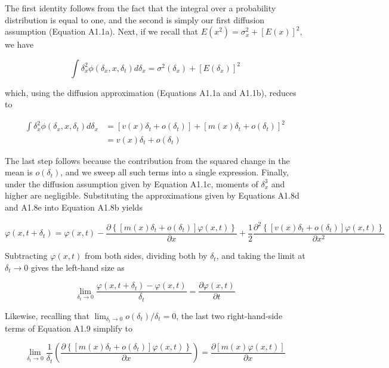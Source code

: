 \documentclass{article}
\begin{document}
The first identity follows from the fact that the integral over a probability distribution is equal to one, and the second is simply our first diffusion assumption (Equation A1.1a). Next, if we recall that  $ E(x^2) = \sigma_x^2 + [E(x)]^2 $, we have

\begin{equation}
\int\delta_{x}^{2}\phi(\delta_{x},x,\delta_{t})d\delta_{x}=\sigma^{2}(\delta_{x})+[E(\delta_{x})]^{2}
\end{equation}

which, using the diffusion approximation (Equations A1.1a and A1.1b), reduces to

\begin{equation}
\begin{align*}\int\delta_{x}^{2}\phi(\delta_{x},x,\delta_{t})d\delta_{x}&=[v(x)\delta_{t}+o(\delta_{t})]+[m(x)\delta_{t}+o(\delta_{t})]^{2}\\&=v(x)\delta_{t}+o(\delta_{t})\end{align*}
\end{equation}

The last step follows because the contribution from the squared change in the mean is  $ o(\delta_t) $, and we sweep all such terms into a single expression. Finally, under the diffusion assumption given by Equation A1.1c, moments of  $ \delta_x^3 $ and higher are negligible. Substituting the approximations given by Equations A1.8d and A1.8e into Equation A1.8b yields

\begin{equation}
\varphi(x,t+\delta_{t})=\varphi(x,t)-\frac{\partial\left\{\left[m(x)\delta_{t}+o(\delta_{t})\right]\varphi(x,t)\right\}}{\partial x}+\frac{1}{2}\frac{\partial^{2}\left\{\left[v(x)\delta_{t}+o(\delta_{t})\right]\varphi(x,t)\right\}}{\partial x^{2}}
\end{equation}

Subtracting  $ \varphi(x,t) $ from both sides, dividing both by  $ \delta_{t} $, and taking the limit at  $ \delta_{t}\to0 $ gives the left-hand size as

\begin{equation}
\lim_{\delta_{t}\to0}\frac{\varphi(x,t+\delta_{t})-\varphi(x,t)}{\delta_{t}}=\frac{\partial\varphi(x,t)}{\partial t}
\end{equation}

Likewise, recalling that  $ \lim_{\delta_t \to 0} o(\delta_t)/\delta_t = 0 $, the last two right-hand-side terms of Equation A1.9 simplify to

\begin{equation}
\lim_{\delta_{t}\to0}\frac{1}{\delta_{t}}\left(\frac{\partial\left\{\left[m(x)\delta_{t}+o(\delta_{t})\right]\varphi(x,t)\right\}}{\partial x}\right)=\frac{\partial[m(x)\varphi(x,t)]}{\partial x}
\end{equation}
\end{document}
